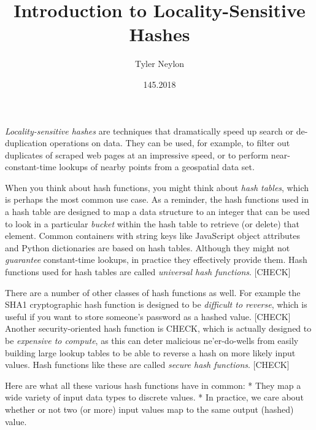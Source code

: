 \documentclass[20pt,]{extarticle}
\title{Introduction to Locality-Sensitive Hashes}
\author{Tyler Neylon}
\date{145.2018}
\newcommand{\class}[1]{}
\newcommand{\optquad}{\quad}
\newcommand{\smallscrneg}{}
\newcommand{\smallscr}[1]{}
\newcommand{\bigscr}[1]{#1}
\newcommand{\smallscrskip}[1]{}
\begin{document}
\maketitle

\newcommand{\R}{\mathbb{R}}
\newcommand{\Z}{\mathbb{Z}}
\newcommand{\eqnset}[1]{\left.\mbox{$#1$}\;\;\right\rbrace\class{postbrace}{ }}
\providecommand{\optquad}{\class{optquad}{}}
\providecommand{\smallscrneg}{\class{smallscrneg}{ }}
\providecommand{\bigscr}[1]{\class{bigscr}{#1}}
\providecommand{\smallscr}[1]{\class{smallscr}{#1}}
\providecommand{\smallscrskip}[1]{\class{smallscrskip}{\hskip #1}}

\emph{Locality-sensitive hashes} are techniques that dramatically speed
up search or de-duplication operations on data. They can be used, for
example, to filter out duplicates of scraped web pages at an impressive
speed, or to perform near-constant-time lookups of nearby points from a
geospatial data set.

When you think about hash functions, you might think about \emph{hash
tables}, which is perhaps the most common use case. As a reminder, the
hash functions used in a hash table are designed to map a data structure
to an integer that can be used to look in a particular \emph{bucket}
within the hash table to retrieve (or delete) that element. Common
containers with string keys like JavaScript object attributes and Python
dictionaries are based on hash tables. Although they might not
\emph{guarantee} constant-time lookups, in practice they effectively
provide them. Hash functions used for hash tables are called
\emph{universal hash functions}. {[}CHECK{]}

There are a number of other classes of hash functions as well. For
example the SHA1 cryptographic hash function is designed to be
\emph{difficult to reverse}, which is useful if you want to store
someone's password as a hashed value. {[}CHECK{]} Another
security-oriented hash function is CHECK, which is actually designed to
be \emph{expensive to compute}, as this can deter malicious
ne'er-do-wells from easily building large lookup tables to be able to
reverse a hash on more likely input values. Hash functions like these
are called \emph{secure hash functions}. {[}CHECK{]}

Here are what all these various hash functions have in common: * They
map a wide variety of input data types to discrete values. * In
practice, we care about whether or not two (or more) input values map to
the same output (hashed) value.
\end{document}
